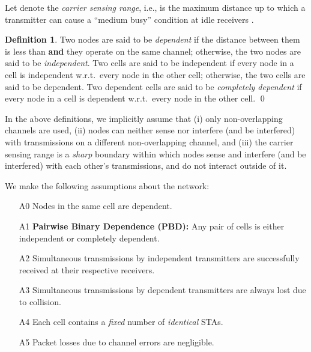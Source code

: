 \documentclass[10pt,a4paper,journal]{IEEEtran}
\theoremstyle{definition}
\newtheorem{definition}{Definition}[section]
\theoremstyle{remark}
\theoremstyle{plain}
\begin{document}
Let  denote the \textit{carrier sensing range}, i.e.,  is the maximum distance up to which a transmitter can cause a ``medium busy'' condition at idle receivers \cite{wanet.roy_etal09ToN-PCS,wanet.liew_etal09mobicom-capacity-wireless-networks}. 

\begin{definition}
\label{defn:dependence}
Two nodes are said to be \textit{dependent} if the distance between them is less than  \textbf{and} they operate on the same channel; otherwise, the two nodes are said to be \textit{independent}. Two cells are said to be independent if every node in a cell is independent w.r.t.~every node in the other cell; otherwise, the two cells are said to be dependent. Two dependent cells are said to be \textit{completely dependent} if every node in a cell is dependent w.r.t.~every node in the other cell. \hfill \qed
\end{definition}

In the above definitions, we implicitly assume that (i) only non-overlapping channels are used, (ii) nodes can neither sense nor interfere (and be interfered) with transmissions on a different non-overlapping channel, and (iii) the carrier sensing range  is a \textit{sharp} boundary within which nodes sense and interfere (and be interfered) with each other's transmissions, and do not interact outside of it. 

We make the following assumptions about the network:
\begin{itemize}

\item [A0] Nodes in the same cell are dependent. 

\item [A1] \textbf{Pairwise Binary Dependence (PBD):} Any pair of cells is either independent or completely dependent. 

\item [A2] Simultaneous transmissions by independent transmitters are successfully received at their respective receivers. 

\item [A3] Simultaneous transmissions by dependent transmitters are always lost due to collision. 

\item [A4] Each cell contains a \textit{fixed} number of \textit{identical} STAs. 

\item [A5] Packet losses due to channel errors are negligible.

\end{itemize}
\end{document}
